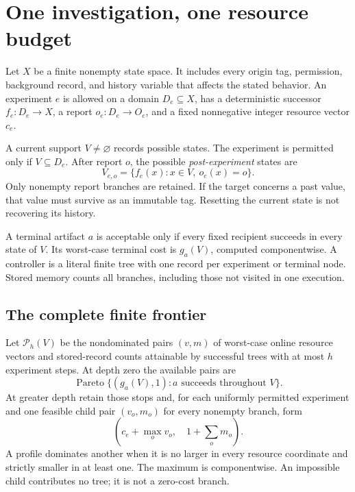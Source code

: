 \chapter{One investigation, one resource budget}\label{ch:inquiry}
Let $X$ be a finite nonempty state space. It includes every origin tag, permission, background record, and history variable that affects the stated behavior. An experiment $e$ is allowed on a domain $D_e\subseteq X$, has a deterministic successor $f_e:D_e\to X$, a report $o_e:D_e\to O_e$, and a fixed nonnegative integer resource vector $c_e$.

A current support $V\ne\varnothing$ records possible states. The experiment is permitted only if $V\subseteq D_e$. After report $o$, the possible \emph{post-experiment} states are
\[
V_{e,o}=\{f_e(x):x\in V,\ o_e(x)=o\}.
\]
Only nonempty report branches are retained. If the target concerns a past value, that value must survive as an immutable tag. Resetting the current state is not recovering its history.

A terminal artifact $a$ is acceptable only if every fixed recipient succeeds in every state of $V$. Its worst-case terminal cost is $g_a(V)$, computed componentwise. A controller is a literal finite tree with one record per experiment or terminal node. Stored memory counts all branches, including those not visited in one execution.

\section{The complete finite frontier}
Let $\mathcal P_h(V)$ be the nondominated pairs $(v,m)$ of worst-case online resource vectors and stored-record counts attainable by successful trees with at most $h$ experiment steps. At depth zero the available pairs are
\[
\operatorname{Pareto}\{(g_a(V),1):a\text{ succeeds throughout }V\}.
\]
At greater depth retain those stops and, for each uniformly permitted experiment and one feasible child pair $(v_o,m_o)$ for every nonempty branch, form
\[
\left(c_e+\max_o v_o,\quad1+\sum_o m_o\right).
\]
A profile dominates another when it is no larger in every resource coordinate and strictly smaller in at least one. The maximum is componentwise. An impossible child contributes no tree; it is not a zero-cost branch.


